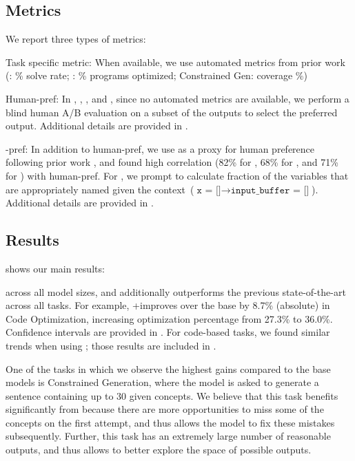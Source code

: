
\subsection{Metrics}
\label{subsec:metrics}
We report three types of metrics:
\squishlist
\item Task specific metric: When available, we use automated metrics from prior work (\gsm: \% solve rate; \codeopt: \% programs optimized; Constrained Gen: coverage \%)
\item Human-pref: In \dialgen, \coderead, \sentxfer, and \acrogen, since no automated metrics are available, we perform a blind human A/B evaluation on a subset of the outputs to select the preferred output.  Additional details are provided in .
\item \gptf-pref: In addition to human-pref, we use \gptf as a proxy for human preference following prior work \citep{fu2023gptscore, chiang2023vicuna, koala_blogpost_2023, sun2023principle}, and found high correlation (82\% for \sentxfer, 68\% for \acrogen, and 71\% for \dialgen) with human-pref. 
For \coderead, we prompt \gptf to calculate fraction of the variables that are appropriately named given the context~(\eg $\texttt{x = []} \rightarrow \texttt{input\_buffer = []}$). 
Additional details are provided in .
\squishend





\subsection{Results} 
\label{sec:results}

 shows our main results:

 across all model sizes, and additionally outperforms the previous state-of-the-art across all tasks. For example, \gptf{}+\ours improves over the base \gptf by 8.7\% (absolute) in Code Optimization, increasing optimization percentage from 27.3\% to 36.0\%. Confidence intervals are provided in . For code-based tasks, we found similar trends when using \codex; those results are included in  . 

One of the tasks in which we observe the highest gains compared to the base models is Constrained Generation, where the model is asked to generate a sentence containing up to 30 given concepts. We believe that this task benefits significantly from \ours because there are more opportunities to miss some of the concepts on the first attempt, and thus \ours allows the model to fix these mistakes subsequently. Further, this task has an extremely large number of reasonable outputs, and thus \ours allows to better explore the space of possible outputs.

